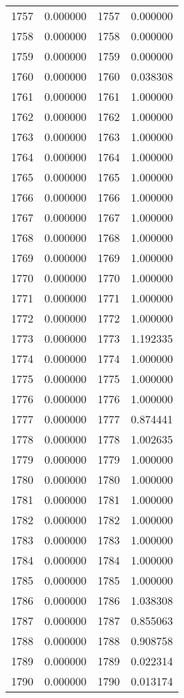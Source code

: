 \documentclass[12pt]{article}
\begin{document}
\begin{longtable}{@{}cccc@{}}
1757 & 0.000000 & 1757 & 0.000000 \\
1758 & 0.000000 & 1758 & 0.000000 \\
1759 & 0.000000 & 1759 & 0.000000 \\
1760 & 0.000000 & 1760 & 0.038308 \\
1761 & 0.000000 & 1761 & 1.000000 \\
1762 & 0.000000 & 1762 & 1.000000 \\
1763 & 0.000000 & 1763 & 1.000000 \\
1764 & 0.000000 & 1764 & 1.000000 \\
1765 & 0.000000 & 1765 & 1.000000 \\
1766 & 0.000000 & 1766 & 1.000000 \\
1767 & 0.000000 & 1767 & 1.000000 \\
1768 & 0.000000 & 1768 & 1.000000 \\
1769 & 0.000000 & 1769 & 1.000000 \\
1770 & 0.000000 & 1770 & 1.000000 \\
1771 & 0.000000 & 1771 & 1.000000 \\
1772 & 0.000000 & 1772 & 1.000000 \\
1773 & 0.000000 & 1773 & 1.192335 \\
1774 & 0.000000 & 1774 & 1.000000 \\
1775 & 0.000000 & 1775 & 1.000000 \\
1776 & 0.000000 & 1776 & 1.000000 \\
1777 & 0.000000 & 1777 & 0.874441 \\
1778 & 0.000000 & 1778 & 1.002635 \\
1779 & 0.000000 & 1779 & 1.000000 \\
1780 & 0.000000 & 1780 & 1.000000 \\
1781 & 0.000000 & 1781 & 1.000000 \\
1782 & 0.000000 & 1782 & 1.000000 \\
1783 & 0.000000 & 1783 & 1.000000 \\
1784 & 0.000000 & 1784 & 1.000000 \\
1785 & 0.000000 & 1785 & 1.000000 \\
1786 & 0.000000 & 1786 & 1.038308 \\
1787 & 0.000000 & 1787 & 0.855063 \\
1788 & 0.000000 & 1788 & 0.908758 \\
1789 & 0.000000 & 1789 & 0.022314 \\
1790 & 0.000000 & 1790 & 0.013174 \\

\end{longtable}
\end{document}
